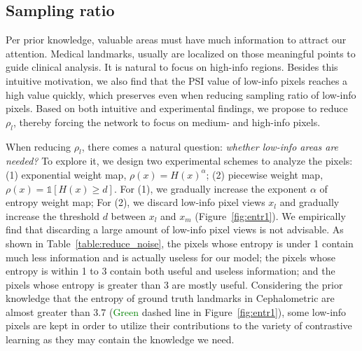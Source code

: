 \documentclass[10pt,twocolumn,letterpaper]{article}
\begin{document}
\subsection{Sampling ratio}  \label{sec:sratio}
Per prior knowledge, valuable areas must have much information to attract our attention. Medical landmarks, usually are localized on those meaningful points to guide clinical analysis. It is natural to focus on high-info regions. Besides this intuitive motivation, we also find that the PSI value of low-info pixels reaches a high value quickly, which preserves even when reducing sampling ratio of low-info pixels. Based on both intuitive and experimental findings, we propose to reduce $\rho_l$, thereby forcing the network to focus on medium- and high-info pixels.

When reducing $\rho_l$, there comes a natural question: \textit{whether low-info areas are needed?}
To explore it, we design two experimental schemes to analyze the pixels: (1) exponential weight map, $\rho(x) = H(x)^\alpha$; (2) piecewise weight map, $\rho(x) = \mathds{1}[H(x) \geq d]$. For (1), we gradually increase the exponent $\alpha$ of entropy weight map; For (2), we discard low-info pixel views $x_l$ and gradually increase the threshold $d$ between $x_l$ and $x_m$ (Figure~\ref{fig:entr1}). We empirically find that discarding a large amount of low-info pixel views is not advisable. As shown in Table~\ref{table:reduce_noise}, the pixels whose entropy is under 1 contain much less information and is actually useless for our model; the pixels whose entropy is within 1 to 3 contain both useful and useless information; and the pixels whose entropy is greater than 3 are mostly useful. 
Considering the prior knowledge that the entropy of ground truth landmarks in Cephalometric are almost greater than 3.7 (\textcolor{green}{Green} dashed line in Figure~\ref{fig:entr1}), some low-info pixels are kept in order to utilize their contributions to the variety of contrastive learning as they may contain the knowledge we need. %
\end{document}
